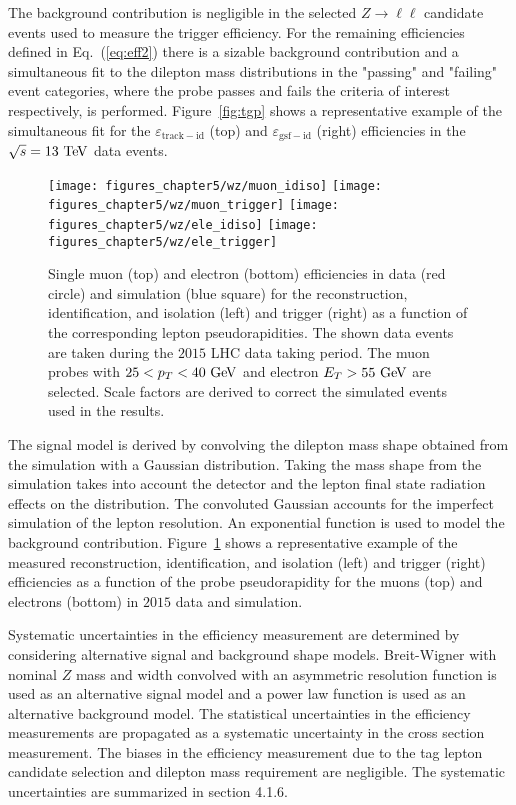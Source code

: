 The background contribution is negligible in the selected $Z \rightarrow \ell\ell$ candidate events used to measure the trigger efficiency. For the remaining efficiencies defined in Eq.~(\ref{eq:eff2}) there is a sizable background contribution and a simultaneous fit to the dilepton mass distributions in the "passing" and "failing" event categories, where the probe passes and fails the criteria of interest respectively, is performed. Figure~\ref{fig:tgp} shows a representative example of the simultaneous fit for the $\varepsilon_{\mathrm{track-id}}$ (top) and $\varepsilon_{\mathrm{gsf-id}}$ (right) efficiencies in the $\sqrt{s}=13~\mathrm{Te\kern -0.1em V}$ data events.     
\begin{figure}[htbp]
\centering
\texttt{[image: figures\_chapter5/wz/muon\_idiso]}
\texttt{[image: figures\_chapter5/wz/muon\_trigger]}
\texttt{[image: figures\_chapter5/wz/ele\_idiso]}
\texttt{[image: figures\_chapter5/wz/ele\_trigger]}
\caption{Single muon (top) and electron (bottom) efficiencies in data (red circle) and simulation (blue square) for the reconstruction, identification, and isolation (left) and trigger (right) as a function of the corresponding lepton pseudorapidities. The shown data events are taken during the $2015$ LHC data taking period. The muon probes with $25<p_{T}<40~\mathrm{Ge\kern -0.1em V}$ and electron $E_{T}>55~\mathrm{Ge\kern -0.1em V}$ are selected. Scale factors are derived to correct the simulated events used in the results.}
\label{fig:eff_fit}
\end{figure}
The signal model is derived by convolving the dilepton mass shape obtained from the simulation with a Gaussian distribution. Taking the mass shape from the simulation takes into account the detector and the lepton final state radiation effects on the distribution. The convoluted Gaussian accounts for the imperfect simulation of the lepton resolution. An exponential function is used to model the background contribution. Figure~\ref{fig:eff_fit} shows a representative example of the measured reconstruction, identification, and isolation (left) and trigger (right) efficiencies as a function of the probe pseudorapidity for the muons (top) and electrons (bottom) in $2015$ data and simulation.

Systematic uncertainties in the efficiency measurement are determined by considering alternative signal and background shape models. Breit-Wigner with nominal $Z$ mass and width convolved with an asymmetric resolution function is used as an alternative signal model and a power law function is used as an alternative background model. The statistical uncertainties in the efficiency measurements are propagated as a systematic uncertainty in the cross section measurement. The biases in the efficiency measurement due to the tag lepton candidate selection and dilepton mass requirement are negligible. The systematic uncertainties are summarized in section 4.1.6.    

